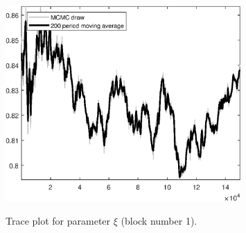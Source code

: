\begin{figure}[H]
\centering
  \includegraphics[width=0.8\textwidth]{BRS_sectoral_wo_gmf/graphs/TracePlot_xi_blck_1}\\
    \caption{Trace plot for parameter $\xi$ (block number 1).}
\end{figure}
